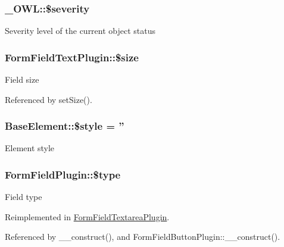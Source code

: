 \subsubsection[{\$severity}]{\setlength{\rightskip}{0pt plus 5cm}\_\-OWL::\$severity}\label{class__OWL_ad26b40a9dbbacb33e299b17826f8327c}
Severity level of the current object status 
\subsubsection[{\$size}]{\setlength{\rightskip}{0pt plus 5cm}FormFieldTextPlugin::\$size}\label{classFormFieldTextPlugin_acb1df0209af99c25587375a0d1c603ea}
Field size 

Referenced by setSize().

\subsubsection[{\$style}]{\setlength{\rightskip}{0pt plus 5cm}BaseElement::\$style = ''}\label{classBaseElement_a429a3d642dd95f30e1059ef29564b87d}
Element style 
\subsubsection[{\$type}]{\setlength{\rightskip}{0pt plus 5cm}FormFieldPlugin::\$type}\label{classFormFieldPlugin_acf8210731f7b8dcee47d777975bc91ca}
Field type 

Reimplemented in \hyperlink{classFormFieldTextareaPlugin_af23729f44357a182a2b25a2689fca464}{FormFieldTextareaPlugin}.



Referenced by \_\-\_\-construct(), and FormFieldButtonPlugin::\_\-\_\-construct().

